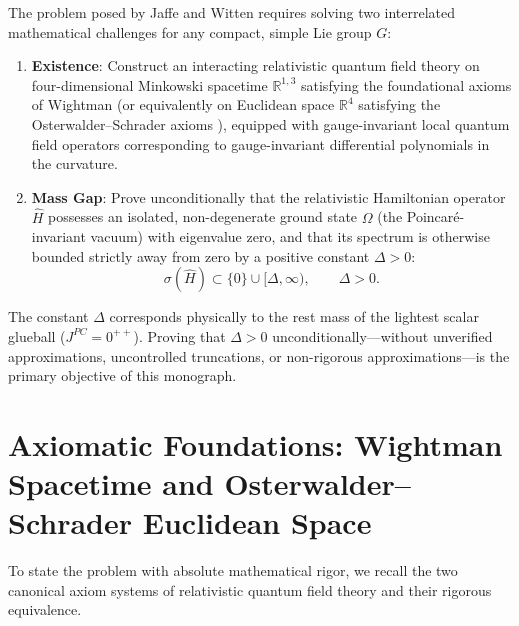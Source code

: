 The problem posed by Jaffe and Witten requires solving two interrelated mathematical challenges for any compact, simple Lie group $G$:
\begin{enumerate}
    \item \textbf{Existence}: Construct an interacting relativistic quantum field theory on four-dimensional Minkowski spacetime $\mathbb{R}^{1,3}$ satisfying the foundational axioms of Wightman \cite{StreaterWightman1964, JaffeWitten2000} (or equivalently on Euclidean space $\mathbb{R}^4$ satisfying the Osterwalder--Schrader axioms \cite{OsterwalderSchrader1973, OsterwalderSchrader1975}), equipped with gauge-invariant local quantum field operators corresponding to gauge-invariant differential polynomials in the curvature.
    \item \textbf{Mass Gap}: Prove unconditionally that the relativistic Hamiltonian operator $\hat{H}$ possesses an isolated, non-degenerate ground state $\Omega$ (the Poincaré-invariant vacuum) with eigenvalue zero, and that its spectrum is otherwise bounded strictly away from zero by a positive constant $\Delta > 0$:
    \begin{equation}
    \label{eq:intro_mass_gap_def}
    \sigma(\hat{H}) \subset \{0\} \cup [\Delta, \infty), \qquad \Delta > 0.
    \end{equation}
\end{enumerate}
The constant $\Delta$ corresponds physically to the rest mass of the lightest scalar glueball ($J^{PC} = 0^{++}$). Proving that $\Delta > 0$ unconditionally---without unverified approximations, uncontrolled truncations, or non-rigorous approximations---is the primary objective of this monograph.

\section{Axiomatic Foundations: Wightman Spacetime and Osterwalder--Schrader Euclidean Space}
\label{sec:axiomatic_framework}

To state the problem with absolute mathematical rigor, we recall the two canonical axiom systems of relativistic quantum field theory and their rigorous equivalence.

